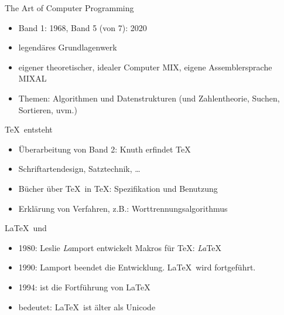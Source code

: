 \begin{frame}{The Art of Computer Programming}

\begin{itemize}
\itemsep1pt\parskip0pt
\item
  Band 1: 1968, Band 5 (von 7): 2020
\item
  legendäres Grundlagenwerk
\item
  eigener theoretischer, idealer Computer MIX, eigene Assemblersprache
  MIXAL
\item
  Themen: Algorithmen und Datenstrukturen (und Zahlentheorie, Suchen,
  Sortieren, uvm.)
\end{itemize}

\end{frame}

\begin{frame}{\TeX \ entsteht}

\begin{itemize}
\itemsep1pt\parskip0pt
\item
  Überarbeitung von Band 2: Knuth erfindet \TeX
\item
  Schriftartendesign, Satztechnik, \ldots{}
\item
  Bücher über \TeX \ in \TeX: Spezifikation und Benutzung
\item
  Erklärung von Verfahren, z.B.: Worttrennungsalgorithmus
\end{itemize}

\end{frame}

\begin{frame}{\LaTeX \ und \LaTeXe}

\begin{itemize}
\itemsep1pt\parskip0pt
\item
  1980: Leslie \emph{La}mport entwickelt Makros für \TeX: \emph{La}TeX
\item
  1990: Lamport beendet die Entwicklung. \LaTeX \ wird fortgeführt.
\item
  1994: \LaTeXe ist die Fortführung von \LaTeX
\item
  bedeutet: \LaTeX \ ist älter als Unicode
\end{itemize}

\end{frame}

